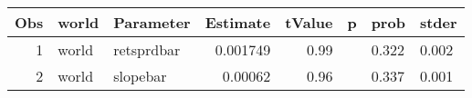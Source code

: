 

\begin{longtable}{|r|l|l|r|r|l|l|l|}\hline
   Obs &    world &    Parameter &    Estimate &    tValue &    p &    prob &    stder\\\hline
\endhead
   1 &    world &    retsprdbar &    0.001749 &    0.99 &      &    0.322 &    0.002\\\hline
   2 &    world &    slopebar &    0.00062 &    0.96 &      &    0.337 &    0.001\\\hline
\end{longtable}

